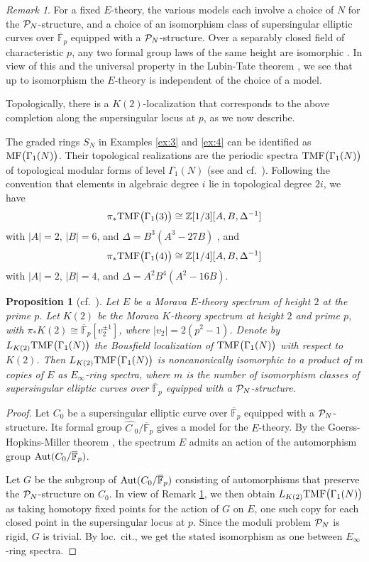\documentclass{gtpart}
\newtheorem{prop}[thm]{Proposition}
\theoremstyle{definition}
\theoremstyle{remark}
\newtheorem{rmk}[thm]{Remark}
\newcommand{\mb}[1]{\mathbb{#1}}
\newcommand{\Aut}{{\rm Aut}}
\newcommand{\cF}{\overline {\mb F}}
\newcommand{\CP}{{\cal P}}
\newcommand{\BZ}{{\mb Z}}
\newcommand{\HC}{\widehat{C~}\!}
\newcommand{\TMF}{{\rm TMF}}
\newcommand{\MF}{{\rm MF}}
\renewcommand{\D}{\Delta}
\newcommand{\G}{\Gamma}
\renewcommand{\=}{\approx}
\renewcommand{\-}{\sim}
\numberwithin{equation}{section}
\numberwithin{thm}{section}
\begin{document}
\begin{rmk}
 \label{rmk:N}
 For a fixed $E$-theory, 
 the various models each involve a choice of $N$ for the $\CP_N$-structure, 
 and a choice of an isomorphism class of supersingular elliptic curves over $\cF_p$ equipped with a $\CP_N$-structure.  
 Over a separably closed field of characteristic $p$, 
 any two formal group laws of the same height are isomorphic \cite[Th\'eor\`eme IV]{Lazard}.  
 In view of this and the universal property in the Lubin-Tate theorem \cite[Theorem 3.1]{LT}, 
 we see that up to isomorphism the $E$-theory is independent of the choice of a model.  
\end{rmk}

Topologically, there is a $K(2)$-localization that corresponds to the above completion along the supersingular locus at $p$, as we now describe.  

The graded rings $S_N$ in Examples \ref{ex:3} and \ref{ex:4} 
can be identified as $\MF\big(\G_1(N)\big)$.  
Their topological realizations are the periodic spectra $\TMF\big(\G_1(N)\big)$ of topological modular forms of level $\G_1(N)$ (see \cite[Section 2]{tmf3} and cf.~\cite{logetaletmf}).  
Following the convention that elements in algebraic degree $i$ lie in topological degree $2 i$, we have 
\[
 \pi_* \TMF\big(\G_1(3)\big) \cong \BZ[1/3][A, B, \D^{-1}] 
\]
with $|A| = 2$, $|B| = 6$, and $\D = B^3 (A^3 - 27 B)$ \cite[Corollary 3.3]{tmf3}, and 
\[
 \pi_* \TMF\big(\G_1(4)\big) \cong \BZ[1/4][A, B, \D^{-1}] 
\]
with $|A| = 2$, $|B| = 4$, and $\D = A^2 B^4 (A^2 - 16 B)$.  
\begin{prop}[cf.~{\cite[Section 3.5]{BOSS}}]
 \label{prop:tmfe}
 Let $E$ be a Morava $E$-theory spectrum of height $2$ at the prime $p$.  
 Let $K(2)$ be the Morava $K$-theory spectrum at height $2$ and prime $p$, with $\pi_* K(2) \cong \cF_p [v_2^{\pm 1}]$, where $|v_2| = 2 (p^2 - 1)$.  
 Denote by $L_{K(2)} \TMF\big(\G_1(N)\big)$ the Bousfield localization of $\TMF\big(\G_1(N)\big)$ with respect to $K(2)$.  
 Then $L_{K(2)} \TMF\big(\G_1(N)\big)$ is noncanonically isomorphic to a product of $m$ copies of $E$ as $E_\infty$-ring spectra, 
 where $m$ is the number of isomorphism classes of supersingular elliptic curves over $\cF_p$ equipped with a $\CP_N$-structure.  
\end{prop}
\begin{proof}
 Let $C_0$ be a supersingular elliptic curve over $\cF_p$ equipped with a $\CP_N$-structure.  
 Its formal group $\HC_0 / \cF_p$ gives a model for the $E$-theory.  
 By the Goerss-Hopkins-Miller theorem \cite[Corollary 7.6]{GH}, 
 the spectrum $E$ admits an action of the automorphism group $\Aut(C_0 / \cF_p)$.  

 Let $G$ be the subgroup of $\Aut(C_0 / \cF_p)$ consisting of automorphisms that preserve the $\CP_N$-structure on $C_0$.  
 In view of Remark \ref{rmk:N}, we then obtain $L_{K(2)} \TMF\big(\G_1(N)\big)$ as taking homotopy fixed points for the action of $G$ on $E$, 
 one such copy for each closed point in the supersingular locus at $p$.  
 Since the moduli problem $\CP_N$ is rigid, $G$ is trivial.  
 By loc.~cit., we get the stated isomorphism as one between $E_\infty$-ring spectra.  
\end{proof}
\end{document}
